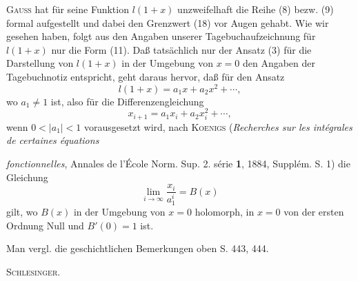 \textsc{Gauss} hat für seine Funktion \(l(1+x)\) unzweifelhaft die Reihe (8) bezw. (9) formal aufgestellt und dabei den Grenzwert (18) vor Augen gehabt. Wie wir gesehen haben, folgt aus den Angaben unserer Tagebuchaufzeichnung für \(l(1+x)\) nur die Form (11). Daß tatsächlich nur der Ansatz (3) für die Darstellung von \(l(1+x)\) in der Umgebung von \(x=0\) den Angaben der Tagebuchnotiz entspricht, geht daraus hervor, daß für den Ansatz
\begin{equation}
l(1+x)=a_1x+a_2x^2+\cdots,\tag*{(3)$'$}
\end{equation}
\noindent wo \(a_1\ne1\) ist, also für die Differenzengleichung
\begin{equation}
x_{i+1}=a_1x_i+a_2x_i^2+\cdots,\tag*{(5)$'$}
\end{equation}
\noindent wenn \(0<|a_1|<1\) vorausgesetzt wird, nach \textsc{Koenigs} (\textit{Recherches sur les intégrales de certaines équations}
\par\endgroup

\clearpage{}
\begingroup\small
\noindent\textit{fonctionnelles}, Annales de l'École Norm. Sup. 2. série \textbf{1}, 1884, Supplém. S. 1) die Gleichung
\[
\lim_{i\to\infty}\frac{x_i}{a_1^i}=B(x)
\]
\noindent gilt, wo \(B(x)\) in der Umgebung von \(x=0\) holomorph, in \(x=0\) von der ersten Ordnung Null und \(B'(0)=1\) ist.

Man vergl. die geschichtlichen Bemerkungen oben S. 443, 444.
\par\noindent\hfill\textsc{Schlesinger.}
\par\endgroup
